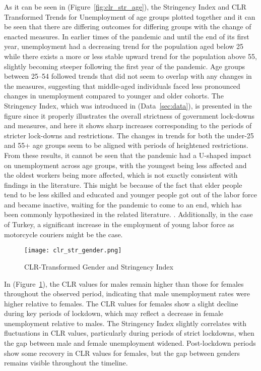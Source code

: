 \documentclass[a4paper,12pt]{article}
\begin{document}
  As it can be seen in  (Figure~\ref{fig:clr_str_age}), the Stringency Index and CLR Transformed Trends for Unemployment of age groups plotted together and it can be seen that there are differing outcomes for differing groups with the change of enacted measures. In earlier times of the pandemic and until the end of its first year, unemployment had a decreasing trend for the population aged below 25 while there exists a more or less stable upward trend for the population above 55, slightly becoming steeper following the first year of the pandemic. Age groups between 25–54 followed trends that did not seem to overlap with any changes in the measures, suggesting that middle-aged individuals faced less pronounced changes in unemployment compared to younger and older cohorts. The Stringency Index, which was introduced in (Data~\ref{sec:data}), is presented in the figure since it properly illustrates the overall strictness of government lock-downs and measures, and here it shows sharp increases corresponding to the periods of stricter lock-downs and restrictions. The changes in trends for both the under-25 and 55+ age groups seem to be aligned with periods of heightened restrictions. From these results, it cannot be seen that the pandemic had a U-shaped impact on unemployment across age groups, with the youngest being less affected and the oldest workers being more affected, which is not exactly consistent with findings in the literature. This might be because of the fact that elder people tend to be less skilled and educated and younger people got out of the labor force and became inactive, waiting for the pandemic to come to an end, which has been commonly hypothesized in the related literature. \cite{aygun2021} . Additionally, in the case of Turkey, a significant increase in the employment of young labor force as motorcycle couriers might be the case. 


\begin{figure}[H]
    \centering
        \texttt{[image: clr\_str\_gender.png]}
        \caption{CLR-Transformed Gender and Stringency Index}
        \label{fig:clr_str_gender}
\end{figure}
In (Figure~\ref{fig:clr_str_gender}), the CLR values for males remain higher than those for females throughout the observed period, indicating that male unemployment rates were higher relative to females. The CLR values for females show a slight decline during key periods of lockdown, which may reflect a decrease in female unemployment relative to males. The Stringency Index slightly correlates with fluctuations in CLR values, particularly during periods of strict lockdowns, when the gap between male and female unemployment widened. Post-lockdown periods show some recovery in CLR values for females, but the gap between genders remains visible throughout the timeline.
\end{document}
